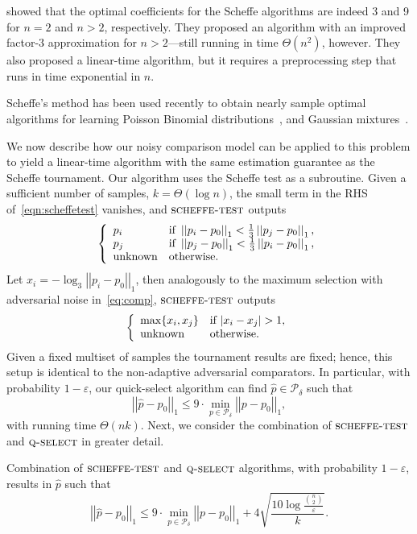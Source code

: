 \documentclass[twoside,11pt]{article}
\newcommand{\cP}{\mathcal{P}}
\newcommand{\norm}[1]{\left|\left|#1\right|\right|}
\newcommand{\algorithms}[1]{\textsc{#1}}
\newcommand{\algquickselect}{\algorithms{q-select}}
\newcommand{\algscheffetest}{\textsc{scheffe-test}}
\newcommand{\deltacover}{\delta}
\newcommand{\errordens}{\varepsilon}
\begin{document}
\citet{MahalanabisS08} showed that the optimal coefficients for the
Scheffe algorithms are indeed 3 and 9 for $n=2$ and $n>2$,
respectively.
They proposed an algorithm with an improved factor-$3$ approximation for
$n>2$---still running in time $\Theta(n^2)$, however. They
also proposed a linear-time algorithm, but it requires a
preprocessing step that runs in time exponential in $n$. 

Scheffe's method has been used recently to
obtain nearly sample optimal algorithms for learning Poisson Binomial
distributions~\citep{DaskalakisDS12}, and
Gaussian mixtures~\citep{DaskalakisK13, AcharyaJOS14}. 

We now describe how our noisy comparison model can be applied to this
problem to yield a linear-time algorithm with the same estimation
guarantee as the Scheffe tournament. Our algorithm uses the Scheffe test as a
subroutine. Given a sufficient number of samples, $k=\Theta(\log n)$,
the small term in the RHS of~\eqref{eqn:scheffetest} vanishes, and
$\algscheffetest$ outputs
\[
\left\{
\begin{array}{ll}
p_i & \text{if } \norm{p_i-p_0}_1 <\frac13 \norm{p_j-p_0}_1,\\
p_j & \text{if } \norm{p_j-p_0}_1 <\frac13 \norm{p_i-p_0}_1,\\
\textnormal{unknown} & \text{otherwise.} 
\end{array} \right.
\]
Let $x_i=-\log_3\norm{p_i-p_0}_1$, then analogously to the maximum
selection with adversarial noise in~\eqref{eq:comp}, $\algscheffetest$
outputs
\[
\left\{
\begin{array}{ll}
\max\{x_i,x_j\} & \text{if } |x_i-x_j|>1,\\
\textnormal{unknown} & \text{otherwise.} 
\end{array} \right.
\]
Given a fixed multiset of samples the tournament results are fixed;
hence, this setup is identical to the non-adaptive adversarial
comparators.  In particular, with probability $1-\errordens$, our
quick-select algorithm can find $\hat{p}\in \cP_{\deltacover}$ such
that
\[
 \norm{\hat{p}-p_0}_1\le 9\cdot \min_{p \in \cP_{\deltacover}} \norm{p-p_0}_1,
\]
with running time $\Theta(nk)$. Next, we consider the combination of $\algscheffetest$ and $\algquickselect$ in greater detail.
\begin{theorem}
 Combination of $\algscheffetest$ and $\algquickselect$ algorithms,
 with probability $1-\errordens$, results in $\hat{p}$ such that
\[
 \norm{\hat{p}-p_0}_1\le 9\cdot \min_{p \in \cP_{\deltacover}}
 \norm{p-p_0}_1+4\sqrt{\frac{10\log \frac{\binom n2}{\errordens}}{k}}.
\]
\end{theorem}
\end{document}
